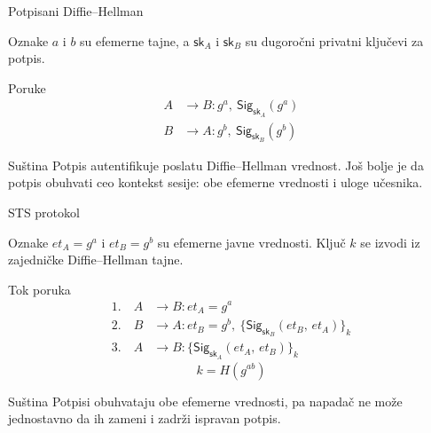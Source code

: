 \documentclass[aspectratio=1610]{beamer}
\newcommand{\enc}[2]{\{#1\}_{#2}}
\newcommand{\sig}[2]{\mathsf{Sig}_{#1}(#2)}
\newcommand{\Hash}[1]{H(#1)}
\newcommand{\sk}{\mathsf{sk}}
\begin{document}
\begin{frame}[t]{Potpisani Diffie--Hellman}
\small
\begin{block}{Oznake}
$a$ i $b$ su efemerne tajne, a $\sk_A$ i $\sk_B$ su dugoročni privatni ključevi za potpis.
\end{block}

\begin{block}{Poruke}
\[
\begin{aligned}
A &\rightarrow B : g^a,\ \sig{\sk_A}{g^a} \\
B &\rightarrow A : g^b,\ \sig{\sk_B}{g^b}
\end{aligned}
\]
\end{block}

\begin{alertblock}{Suština}
Potpis autentifikuje poslatu Diffie--Hellman vrednost. Još bolje je da potpis obuhvati ceo kontekst sesije: obe efemerne vrednosti i uloge učesnika.
\end{alertblock}
\end{frame}

\begin{frame}[t]{STS protokol}
\scriptsize
\begin{block}{Oznake}
$et_A=g^a$ i $et_B=g^b$ su efemerne javne vrednosti. Ključ $k$ se izvodi iz zajedničke Diffie--Hellman tajne.
\end{block}

\begin{block}{Tok poruka}
\[
\begin{aligned}
1.\quad A &\rightarrow B : et_A=g^a \\
2.\quad B &\rightarrow A : et_B=g^b,\ \enc{\sig{\sk_B}{et_B,\,et_A}}{k} \\
3.\quad A &\rightarrow B : \enc{\sig{\sk_A}{et_A,\,et_B}}{k}
\end{aligned}
\]
\[
k=\Hash{g^{ab}}
\]
\end{block}

\begin{alertblock}{Suština}
Potpisi obuhvataju obe efemerne vrednosti, pa napadač ne može jednostavno da ih zameni i zadrži ispravan potpis.
\end{alertblock}
\end{frame}
\end{document}
